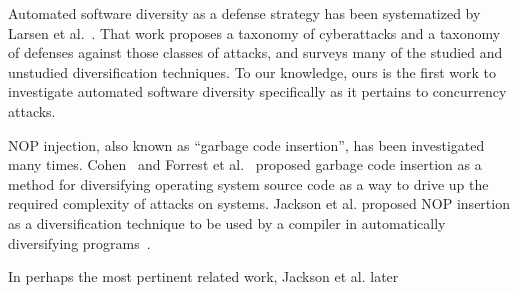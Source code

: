 Automated software diversity as a defense strategy has been systematized by Larsen et al.~\cite{Larsen2014}.
That work proposes a taxonomy of cyberattacks and a taxonomy of defenses against those classes of attacks, and surveys many of the studied and unstudied diversification techniques.
To our knowledge, ours is the first work to investigate automated software diversity specifically as it pertains to concurrency attacks.

NOP injection, also known as ``garbage code insertion'', has been investigated many times.
Cohen~\cite{Cohen1993} and Forrest et al.~\cite{Forrest1997} proposed garbage code insertion as a method for diversifying operating system source code as a way to drive up the required complexity of attacks on systems.
Jackson et al. proposed NOP insertion as a diversification technique to be used by a compiler in automatically diversifying programs~\cite{Jackson2011}.

In perhaps the most pertinent related work, Jackson et al. later 